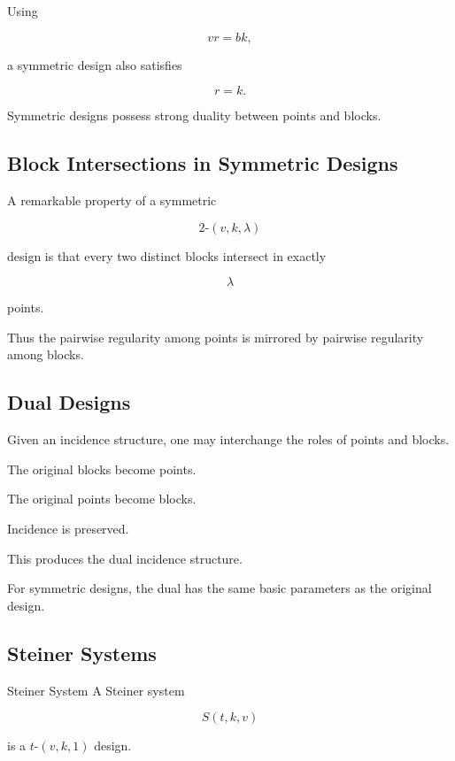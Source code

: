 Using

\[
vr=bk,
\]

a symmetric design also satisfies

\[
\boxed{
r=k.
}
\]

Symmetric designs possess strong duality between points and blocks.

\subsection{Block Intersections in Symmetric Designs}
\label{subsec:symmetric-block-intersections}

A remarkable property of a symmetric

\[
2\text{-}(v,k,\lambda)
\]

design is that every two distinct blocks intersect in exactly

\[
\boxed{
\lambda
}
\]

points.

Thus the pairwise regularity among points is mirrored by pairwise
regularity among blocks.

\subsection{Dual Designs}
\label{subsec:dual-designs}

Given an incidence structure, one may interchange the roles of points
and blocks.

The original blocks become points.

The original points become blocks.

Incidence is preserved.

This produces the dual incidence structure.

For symmetric designs, the dual has the same basic parameters as the
original design.

\subsection{Steiner Systems}
\label{subsec:steiner-systems}

\begin{definitionbox}{Steiner System}
A Steiner system

\[
\boxed{
S(t,k,v)
}
\]

is a \(t\)-\((v,k,1)\) design.
\end{definitionbox}

